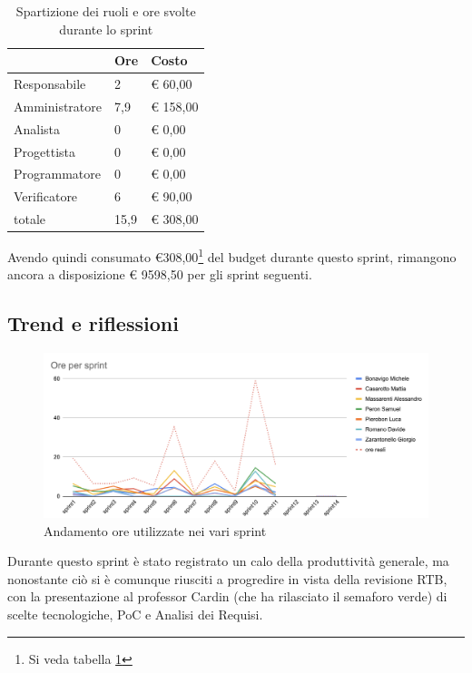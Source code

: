 \begin{table}[ht]
    \begin{tabularx}{\linewidth}{X|l|l}
    \rowcolor{gray!30}& Ore & Costo \\
    \hline

    Responsabile & 2 & € 60,00 \\
    \rowcolor{gray!10}Amministratore & 7,9 & € 158,00 \\
    Analista & 0 & € 0,00 \\
    \rowcolor{gray!10}Progettista & 0 & € 0,00 \\
    Programmatore & 0 & € 0,00 \\
    \rowcolor{gray!10}Verificatore & 6 &€ 90,00 \\
    totale & 15,9 & € 308,00 \\
    \end{tabularx}
    \caption{\label{costi-ruolo}Spartizione dei ruoli e ore svolte durante lo sprint}
\end{table}

Avendo quindi consumato €308,00\footnote{Si veda tabella \ref{costi-ruolo}} del budget durante questo sprint, rimangono ancora a disposizione € 9598,50 per gli sprint seguenti.

\subsection{Trend e riflessioni}\label{subsec:trend}

\begin{figure}[H]
    \includegraphics[width=\linewidth]{img/andamento.png}
    \caption{Andamento ore utilizzate nei vari sprint}\label{img:andamento}
\end{figure}

Durante questo sprint è stato registrato un calo della produttività generale, ma nonostante ciò si è comunque riusciti a progredire in vista della revisione RTB, con la presentazione al professor Cardin (che ha rilasciato il semaforo verde) di scelte tecnologiche, PoC e Analisi dei Requisi.

